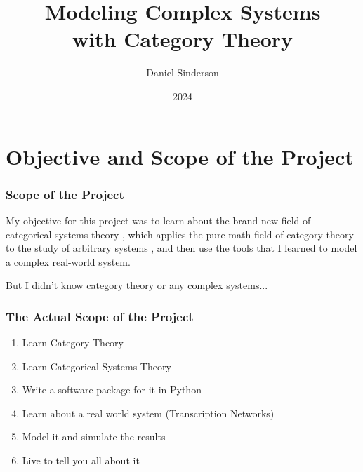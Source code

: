 \documentclass{beamer}
\title{Modeling Complex Systems \\with Category Theory}
\author{Daniel Sinderson}
\institute{Southern Oregon University}
\date{2024}
\begin{document}
\frame{\titlepage}



\section{Objective and Scope of the Project}

\begin{frame}
    \frametitle{Scope of the Project}
    My objective for this project was to learn about the brand new field of categorical systems theory
    , which applies the pure math field of category theory to the study of arbitrary systems
    , and then use the tools that I learned to model a complex real-world system.

    \vspace*{0.25in}

    But I didn't know category theory or any complex systems...
\end{frame}

\begin{frame}
    \frametitle{The Actual Scope of the Project}
    \begin{enumerate}
        \item Learn Category Theory
        \item Learn Categorical Systems Theory
        \item Write a software package for it in Python
        \item Learn about a real world system (Transcription Networks)
        \item Model it and simulate the results
        \item Live to tell you all about it
    \end{enumerate}
\end{frame}
\end{document}
